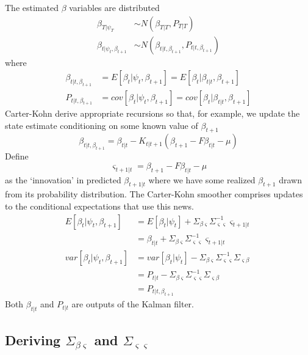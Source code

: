 \documentclass[
  letterpaper,
]{book}
\begin{document}
The estimated \(\beta\) variables are distributed \begin{align}
\beta_{T|\psi_T} &\sim N(\beta_{T|T}, P_{T|T}) \\
\beta_{t|\psi_t, \beta_{t+1}} &\sim N(\beta_{t|t,\beta_{t+1}},P_{t|t,\beta_{t+1}})
\end{align} where \begin{align}
\beta_{t|t,\beta_{t+1}} &= E\left[\beta_t|\psi_t,\beta_{t+1}\right]
= E\left[\beta_t|\beta_{t|t},\beta_{t+1}\right] \\
P_{t|t,\beta_{t+1}} &= cov\left[\beta_t|\psi_t,\beta_{t+1}\right] = cov\left[\beta_t |{\beta_{t|t},\beta_{t+1}}\right]
\end{align} Carter-Kohn derive appropriate recursions so that, for
example, we update the state estimate conditioning on some known value
of \(\beta_{t+1}\) \begin{equation}
  \beta_{t|t,\beta_{t+1}} = \beta_{t|t}-K_{t|t+1} (\beta_{t+1}-F\beta_{t|t}-\mu)
\end{equation} Define \begin{equation}
   \varsigma_{t+1|t} = \beta_{t+1}-F\beta_{t|t}-\mu
\end{equation} as the `innovation' in predicted \(\beta_{t+1|t}\) where
we have some realized \(\beta_{t+1}\) drawn from its probability
distribution. The Carter-Kohn smoother comprises updates to the
conditional expectations that use this news. \begin{align}
E[\beta_t|\psi_t,\beta_{t+1}] &= E[\beta_t|\psi_t] + \Sigma_{\beta\varsigma} \Sigma_{\varsigma\varsigma}^{-1}\varsigma_{t+1|t} \\
&= \beta_{t|t} + \Sigma_{\beta\varsigma}\Sigma_{\varsigma\varsigma}^{-1}\varsigma_{t+1|t} \\
var[\beta_t|\psi_t,\beta_{t+1}] &= var[\beta_t|\psi_t] -\Sigma_{\beta\varsigma} \Sigma_{\varsigma\varsigma}^{-1} \Sigma_{\varsigma\beta} \\
&= P_{t|t} - \Sigma_{\beta\varsigma} \Sigma_{\varsigma\varsigma}^{-1} \Sigma_{\varsigma\beta} \\
&= P_{t|t,\beta_{t+1}}
\end{align} Both \(\beta_{t|t}\) and \(P_{t|t}\) are outputs of the
Kalman filter.

\hypertarget{deriving-sigma_betavarsigma-and-sigma_varsigmavarsigma}{%
\subsection{\texorpdfstring{Deriving \(\Sigma_{\beta\varsigma}\) and
\(\Sigma_{\varsigma\varsigma}\)}{Deriving \textbackslash Sigma\_\{\textbackslash beta\textbackslash varsigma\} and \textbackslash Sigma\_\{\textbackslash varsigma\textbackslash varsigma\}}}\label{deriving-sigma_betavarsigma-and-sigma_varsigmavarsigma}}
\end{document}
